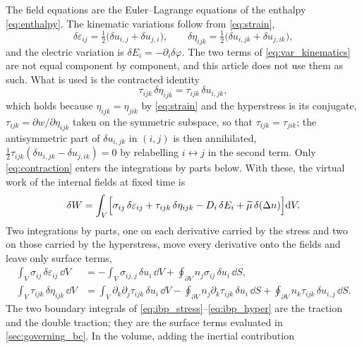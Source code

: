 The field equations are the Euler--Lagrange equations of the enthalpy
\eqref{eq:enthalpy}.  The kinematic variations follow from \eqref{eq:strain},
\begin{equation}
\label{eq:var_kinematics}
\delta\varepsilon_{ij}=\tfrac12\bigl(\delta u_{i,j}+\delta u_{j,i}\bigr),
\qquad
\delta\eta_{ijk}=\tfrac12\bigl(\delta u_{i,jk}+\delta u_{j,ik}\bigr),
\end{equation}
and the electric variation is $\delta E_i=-\partial_i\delta\varphi$.  The two
terms of \eqref{eq:var_kinematics} are not equal component by component, and this
article does not use them as such.  What is used is the contracted identity
\begin{equation}
\label{eq:contraction}
\tau_{ijk}\,\delta\eta_{ijk}=\tau_{ijk}\,\delta u_{i,jk},
\end{equation}
which holds because $\eta_{ijk}=\eta_{jik}$ by \eqref{eq:strain} and the
hyperstress is its conjugate, $\tau_{ijk}=\partial w/\partial\eta_{ijk}$ taken on
the symmetric subspace, so that $\tau_{ijk}=\tau_{jik}$; the antisymmetric part
of $\delta u_{i,jk}$ in $(i,j)$ is then annihilated,
$\tfrac12\tau_{ijk}(\delta u_{i,jk}-\delta u_{j,ik})=0$ by relabelling
$i\leftrightarrow j$ in the second term.  Only \eqref{eq:contraction} enters the
integrations by parts below.  With these, the virtual work of the
internal fields at fixed time is
\begin{equation}
\label{eq:virtual_work}
\delta W=\int_V\Bigl[\sigma_{ij}\,\delta\varepsilon_{ij}
+\tau_{ijk}\,\delta\eta_{ijk}-D_i\,\delta E_i
+\widetilde\mu\,\delta(\Delta n)\Bigr]\mathrm{d} V .
\end{equation}
Two integrations by parts, one on each derivative carried by the stress and two
on those carried by the hyperstress, move every derivative onto the fields and
leave only surface terms,
\begin{align}
\int_V\sigma_{ij}\,\delta\varepsilon_{ij}\,\dd V
&=-\int_V\sigma_{ij,j}\,\delta u_i\,\dd V
+\oint_{\partial V}n_j\sigma_{ij}\,\delta u_i\,\dd S ,
\label{eq:ibp_stress}\\[2pt]
\int_V\tau_{ijk}\,\delta\eta_{ijk}\,\dd V
&=\int_V\partial_k\partial_j\tau_{ijk}\,\delta u_i\,\dd V
-\oint_{\partial V}n_j\partial_k\tau_{ijk}\,\delta u_i\,\dd S
+\oint_{\partial V}n_k\tau_{ijk}\,\delta u_{i,j}\,\dd S .
\label{eq:ibp_hyper}
\end{align}
The two boundary integrals of \eqref{eq:ibp_stress}--\eqref{eq:ibp_hyper} are the
traction and the double traction; they are the surface terms evaluated in
\cref{sec:governing_bc}.  In the volume, adding the inertial contribution
